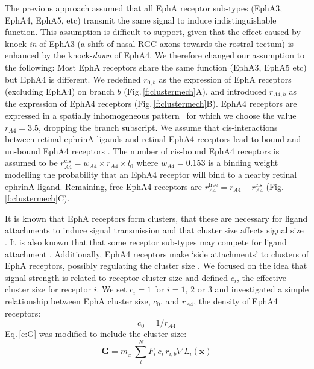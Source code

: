 \documentclass[11pt, a4paper]{article}
\begin{document}
The previous approach assumed that all EphA receptor sub-types (EphA3, EphA4, EphA5, etc) transmit the same signal to induce indistinguishable function.
This assumption is difficult to support, given that the effect caused by knock-\emph{in} of EphA3 (a shift of nasal RGC axons towards the rostral tectum) is enhanced by the knock-\emph{down} of EphA4. 
We therefore changed our assumption to the following: Most EphA receptors share the same function (EphA3, EphA5 etc) but EphA4 is different. 
We redefined $r_{\!\scriptscriptstyle 0,b}$ as the expression of EphA receptors (excluding EphA4) on branch $b$ (Fig.\,\ref{f:clustermech}A), and introduced $r_{\!\scriptscriptstyle A4,b}$ as the expression of EphA4 receptors (Fig.\,\ref{f:clustermech}B). EphA4 receptors are expressed in a spatially inhomogeneous pattern~\citep{reber_relative_2004} for which we choose the value $r_{\!\scriptscriptstyle A4} = 3.5$, dropping the branch subscript.  We assume that cis-interactions between retinal ephrinA ligands and retinal EphA4 receptors lead to bound and un-bound EphA4 receptors \citep{hornberger_modulation_1999}. The number of cis-bound EphA4 receptors is assumed to be $r_{\!\scriptscriptstyle A4}^{\mathrm{cis}} = w_{\!\scriptscriptstyle A4} \times r_{\!\scriptscriptstyle A4} \times l_0$ where $w_{\!\scriptscriptstyle A4} = 0.153$ is a binding weight modelling the probability that an EphA4 receptor will bind to a nearby retinal ephrinA ligand. Remaining, free EphA4 receptors are $r_{\!\scriptscriptstyle A4}^{\mathrm{free}} = r_{\!\scriptscriptstyle A4} - r_{\!\scriptscriptstyle A4}^{\mathrm{cis}}$ (Fig.\,\ref{f:clustermech}C). 

It is known that EphA receptors form clusters, that these are necessary for ligand attachments to induce signal transmission and that cluster size affects signal size \citep{nikolov_ephephrin_2013}. It is also known that that some receptor sub-types may compete for ligand attachment \citep{fiore_regulation_2019}.
Additionally, EphA4 receptors make `side attachments' to clusters of EphA receptors, possibly regulating the cluster size \citep{nikolov_ephephrin_2013}. 
%
We focused on the idea that signal strength is related to receptor cluster size and defined $c_i$, the effective cluster size for receptor $i$. 
We set $c_i=1$ for $i=1$, $2$ or $3$ and investigated a simple relationship between EphA cluster size, $c_0$, and $r_{\!\scriptscriptstyle A4}$, the density of EphA4 receptors:
\begin{equation}
    c_0 = 1/r_{\!\scriptscriptstyle A4}
\end{equation}
%
Eq.\,\ref{e:G} was modified to include the cluster size:
%
\begin{equation}\label{e:Gcs}
\mathbf{G} = m_{\!_G}\,\sum_i^N F_i\,c_i\,r_{i,b} \nabla L_i(\mathbf{x})
\end{equation}
\end{document}
